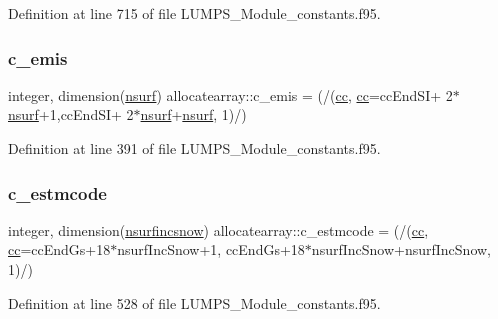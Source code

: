 Definition at line 715 of file L\+U\+M\+P\+S\+\_\+\+Module\+\_\+constants.\+f95.

\mbox{\label{namespaceallocatearray_aaf59aa57c3692da64fc1105b477d5f05}} 
\subsubsection{\texorpdfstring{c\+\_\+emis}{c\_emis}}
{\footnotesize\ttfamily integer, dimension(\hyperlink{namespaceallocatearray_acd22f92a06f7e9a2a91426b3dc99fdb0}{nsurf}) allocatearray\+::c\+\_\+emis = (/(\hyperlink{namespaceallocatearray_ac863c81704eb507dee10f5e10741e10c}{cc}, \hyperlink{namespaceallocatearray_ac863c81704eb507dee10f5e10741e10c}{cc}=cc\+End\+SI+ 2$\ast$\hyperlink{namespaceallocatearray_acd22f92a06f7e9a2a91426b3dc99fdb0}{nsurf}+1,cc\+End\+SI+ 2$\ast$\hyperlink{namespaceallocatearray_acd22f92a06f7e9a2a91426b3dc99fdb0}{nsurf}+\hyperlink{namespaceallocatearray_acd22f92a06f7e9a2a91426b3dc99fdb0}{nsurf}, 1)/)}



Definition at line 391 of file L\+U\+M\+P\+S\+\_\+\+Module\+\_\+constants.\+f95.

\mbox{\label{namespaceallocatearray_abae147fda5b19fe8fc0944b217968bf8}} 
\subsubsection{\texorpdfstring{c\+\_\+estmcode}{c\_estmcode}}
{\footnotesize\ttfamily integer, dimension(\hyperlink{namespaceallocatearray_af4d113f332b6759cfa22271140c9162d}{nsurfincsnow}) allocatearray\+::c\+\_\+estmcode = (/(\hyperlink{namespaceallocatearray_ac863c81704eb507dee10f5e10741e10c}{cc}, \hyperlink{namespaceallocatearray_ac863c81704eb507dee10f5e10741e10c}{cc}=cc\+End\+Gs+18$\ast$nsurf\+Inc\+Snow+1, cc\+End\+Gs+18$\ast$nsurf\+Inc\+Snow+nsurf\+Inc\+Snow, 1)/)}



Definition at line 528 of file L\+U\+M\+P\+S\+\_\+\+Module\+\_\+constants.\+f95.

\mbox{\label{namespaceallocatearray_afe130fb4e5703304158597061af686f9}} 
